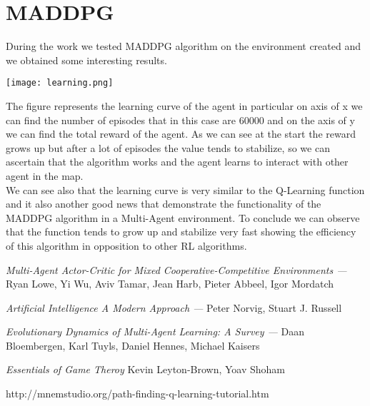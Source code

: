 \documentclass[]{report}
\begin{document}
\section{MADDPG}
During the work we tested MADDPG algorithm on the environment created and we obtained some interesting results.

\begin{center}
	\texttt{[image: learning.png]}
\end{center} 
 
The figure represents the learning curve of the agent in particular on axis of x we can find the number of episodes that in this case are 60000 and on the axis of y we can find the total reward of the agent.
As we can see at the start the reward grows up but after a lot of episodes the value tends to stabilize, so we can ascertain that the algorithm works and the agent learns to interact with other agent in the map.\\
We can see also that the learning curve is very similar to the Q-Learning function and it also another good news that demonstrate the functionality of the MADDPG algorithm in a Multi-Agent environment.
To conclude we can observe that the function tends to grow up and stabilize very fast showing the efficiency of this algorithm in opposition to other RL algorithms.

\begin{thebibliography}{9}
	\emph{ Multi-Agent Actor-Critic for Mixed Cooperative-Competitive Environments ---}
	Ryan Lowe, Yi Wu, Aviv Tamar, Jean Harb, Pieter Abbeel, Igor Mordatch
	
	\emph{Artificial Intelligence A Modern Approach ---}
	Peter Norvig, Stuart J. Russell
	
	\emph{Evolutionary Dynamics of Multi-Agent Learning: A Survey ---}
	Daan Bloembergen, Karl Tuyls, Daniel Hennes, Michael Kaisers
	
	\emph{Essentials of Game Theroy}
	Kevin Leyton-Brown, Yoav Shoham
	
	http://mnemstudio.org/path-finding-q-learning-tutorial.htm
\end{thebibliography}
\end{document}
